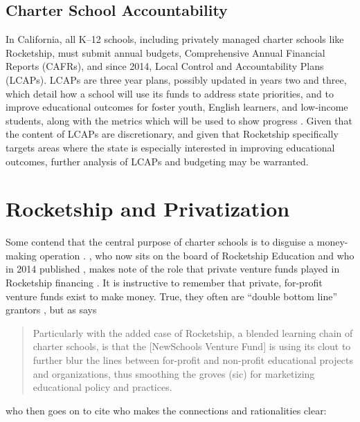 \subsection{Charter School Accountability}\label{sec:charter-accountability}\indent

In California, all K–12 schools, including privately managed charter schools like Rocketship, must submit annual budgets, Comprehensive Annual Financial Reports (CAFRs), and since 2014, Local Control and Accountability Plans (LCAPs). LCAPs are three year plans, possibly updated in years two and three, which detail how a school will use its funds to address state priorities, and to improve educational outcomes for foster youth, English learners, and low-income students, along with the metrics which will be used to show progress \parencite[66–84]{Aguinaldo.etal2021}. Given that the content of LCAPs are discretionary, and given that Rocketship specifically targets areas where the state is especially interested in improving educational outcomes, further analysis of LCAPs and budgeting may be warranted.
\section{Rocketship and Privatization}\label{sec:rocketship-privatization}\indent

Some contend that the central purpose of charter schools is to disguise a money-making operation \parencite{Saltman2018c}. \citeauthor{Whitmire2014}, who now sits on the board of Rocketship Education and who in 2014 published , makes note of the role that private venture funds played in Rocketship financing \parencite[25,65]{Whitmire2014}. It is instructive to remember that private, for-profit venture funds exist to make money. True, they often are ``double bottom line'' grantors \parencite{Clark.etal2004}, but as
\citeauthor{Tewksbury2016} says 

\blockquote[{\parencite[75]{Tewksbury2016}}][]{\OnehalfSpacing%
  Particularly with the added case of Rocketship, a blended learning chain of charter schools, is that the [NewSchools Venture Fund] is using its clout to further blur the lines between for-profit and non-profit educational projects and organizations, thus smoothing the groves (sic) for marketizing educational policy and practices.}\vspace{-0.25\baselineskip}
who then goes on to cite \citeauthor{Ball2012} who makes the connections and rationalities clear:

